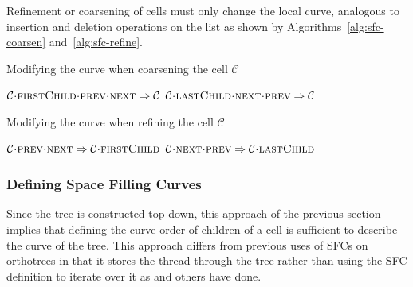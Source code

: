 \documentclass[twoside]{IIBproject}
\newcommand{\acc}{{\mkern 0.5mu\cdot\mkern 0.5mu}}
\numberwithin{figure}{section}
\begin{document}
            Refinement or coarsening of cells must only change the local curve, analogous to insertion and deletion operations on the list as shown by Algorithms~\ref{alg:sfc-coarsen} and~\ref{alg:sfc-refine}.

            \begin{algorithm}[!htbp]
                \caption{Modifying the curve when coarsening the cell $\mathcal{C}$}
                \label{alg:sfc-coarsen}

                \begin{algorithmic}
                    \State $\mathcal{C}\acc\textproc{firstChild}\acc\textproc{prev}\acc\textproc{next} \Rightarrow \mathcal{C}$
                    \State $\mathcal{C}\acc\textproc{lastChild}\acc\textproc{next}\acc\textproc{prev} \Rightarrow \mathcal{C}$
                \end{algorithmic}
            \end{algorithm}

            \begin{algorithm}[!htbp]
                \caption{Modifying the curve when refining the cell $\mathcal{C}$}
                \label{alg:sfc-refine}

                \begin{algorithmic}
                    \Statex
                    \State $\mathcal{C}\acc\textproc{prev}\acc\textproc{next} \Rightarrow \mathcal{C}\acc\textproc{firstChild}$
                    \State $\mathcal{C}\acc\textproc{next}\acc\textproc{prev} \Rightarrow \mathcal{C}\acc\textproc{lastChild}$
                \end{algorithmic}
            \end{algorithm}


        \subsubsection{Defining Space Filling Curves} %
            \label{sec:tftt-sfc}

            Since the tree is constructed top down, this approach of the previous section implies that defining the curve order of children of a cell is sufficient to describe the curve of the tree. This approach differs from previous uses of SFCs on orthotrees in that it stores the thread through the tree rather than using the SFC definition to iterate over it as \cite{bader2013} and others have done.
\end{document}
